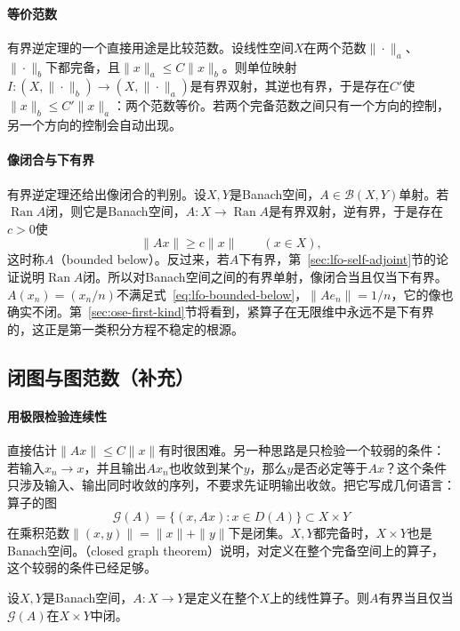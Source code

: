 \paragraph{等价范数}
有界逆定理的一个直接用途是比较范数。设线性空间$X$在两个范数$\|\cdot\|_a$、$\|\cdot\|_b$下都完备，且$\|x\|_a\leq C\|x\|_b$。则单位映射$I:(X,\|\cdot\|_b)\to(X,\|\cdot\|_a)$是有界双射，其逆也有界，于是存在$C'$使$\|x\|_b\leq C'\|x\|_a$：两个范数等价。若两个完备范数之间只有一个方向的控制，另一个方向的控制会自动出现。

\paragraph{像闭合与下有界}
有界逆定理还给出像闭合的判别。设$X,Y$是Banach空间，$A\in\mathcal B(X,Y)$单射。若$\operatorname{Ran}A$闭，则它是Banach空间，$A:X\to\operatorname{Ran}A$是有界双射，逆有界，于是存在$c>0$使
\begin{equation}
 \|Ax\|\geq c\|x\|\qquad(x\in X),
 \label{eq:lfo-bounded-below}
\end{equation}
这时称$A$（bounded below）。反过来，若$A$下有界，第~\ref{sec:lfo-self-adjoint}节的论证说明$\operatorname{Ran}A$闭。所以对Banach空间之间的有界单射，像闭合当且仅当下有界。$A(x_n)=(x_n/n)$不满足式~\eqref{eq:lfo-bounded-below}，$\|Ae_n\|=1/n$，它的像也确实不闭。第~\ref{sec:ose-first-kind}节将看到，紧算子在无限维中永远不是下有界的，这正是第一类积分方程不稳定的根源。

\subsection{闭图与图范数（补充）}
\label{sec:lfo-closed-graph}

\paragraph{用极限检验连续性}
直接估计$\|Ax\|\leq C\|x\|$有时很困难。另一种思路是只检验一个较弱的条件：若输入$x_n\to x$，并且输出$Ax_n$也收敛到某个$y$，那么$y$是否必定等于$Ax$？这个条件只涉及输入、输出同时收敛的序列，不要求先证明输出收敛。把它写成几何语言：算子的图
\[
 \mathcal G(A)=\{(x,Ax):x\in D(A)\}\subset X\times Y
\]
在乘积范数$\|(x,y)\|=\|x\|+\|y\|$下是闭集。$X,Y$都完备时，$X\times Y$也是Banach空间。（closed graph theorem）说明，对定义在整个完备空间上的算子，这个较弱的条件已经足够。

\begin{theorem}[闭图定理]
\label{thm:lfo-closed-graph}
设$X,Y$是Banach空间，$A:X\to Y$是定义在整个$X$上的线性算子。则$A$有界当且仅当$\mathcal G(A)$在$X\times Y$中闭。
\end{theorem}

